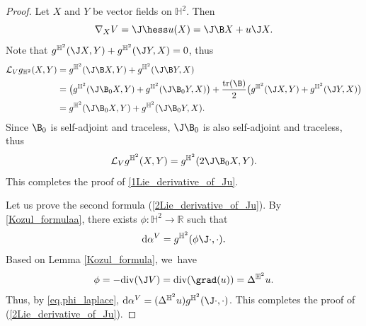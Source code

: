 \begin{proof}
Let $X$ and $Y$ be vector fields on $\mathbb{H}^2$. Then
\[
\nabla_XV=\J\hess u(X)=\J \B X+u\J X.
\]
Note that $g^{\mathbb{H}^2}(\J X,Y)+g^{\mathbb{H}^2}(\J Y,X)=0$, thus
\begin{align*}
\mathcal{L}_Vg_{\mathbb{H}^2}(X,Y)&=g^{\mathbb{H}^2}(\J\B X,Y)+g^{\mathbb{H}^2}(\J\B Y,X)\\
&=\big(g^{\mathbb{H}^2}(\J\B_0 X,Y)+g^{\mathbb{H}^2}(\J\B_0 Y,X)\big)+ \frac{\mathrm{tr}(\B)}{2}\big(g^{\mathbb{H}^2}(\J X,Y)+g^{\mathbb{H}^2}(\J Y,X)\big)\\
&=g^{\mathbb{H}^2}(\J\B_0 X,Y)+g^{\mathbb{H}^2}(\J\B_0 Y,X).
\end{align*}
Since $\B_0$ is self-adjoint and traceless, $\J\B_0 $ is also self-adjoint and traceless, thus
\begin{equation}\label{eq_50_rough_for_divergence_free}
\mathcal{L}_Vg^{\mathbb{H}^2}(X,Y)=g^{\mathbb{H}^2}(2\J\B_0 X,Y).
\end{equation} This completes the proof of \eqref{1Lie_derivative_of_Ju}.

Let us prove the second formula (\ref{2Lie_derivative_of_Ju}). By \eqref{Kozul_formulaa}, there exists \(\phi : \mathbb{H}^2 \to \mathbb{R}\) such that
\begin{equation}\label{eq.phi_laplace}
\mathrm{d}\alpha^V = g^{\mathbb{H}^2}(\phi \J \cdot, \cdot).
\end{equation}
Based on Lemma \ref{Kozul_formula}, we~have
\[ \phi = -\mathrm{div}(\J V) = \mathrm{div}(\grad(u)) =
\Delta^{\mathbb{H}^2} u. \]
Thus, by \eqref{eq.phi_laplace}, \(\mathrm{d}\alpha^V =
(\Delta^{\mathbb{H}^2} u) g^{\mathbb{H}^2}(\J \cdot, \cdot)\). This
completes the proof of (\ref{2Lie_derivative_of_Ju}).


\end{proof}
